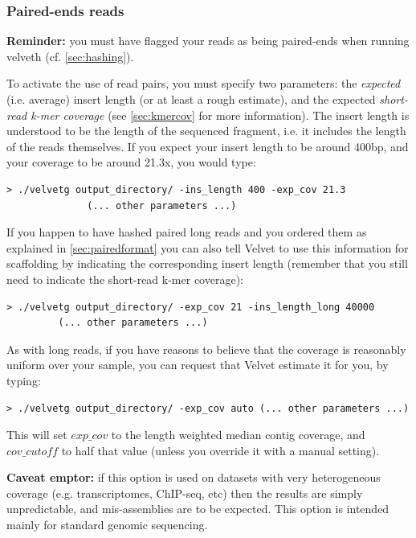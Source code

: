 \documentclass{article}
\begin{document}
	\subsubsection{Paired-ends reads}

\textbf{Reminder:} you must have flagged your reads as being paired-ends when running
velveth (cf. \ref{sec:hashing}).

To activate the use of read pairs, you must specify two parameters: the \emph{expected} (i.e. average) insert length (or at least a rough estimate), and the expected \emph{short-read k-mer coverage} (see \ref{sec:kmercov} for more information). The insert length is understood to be the length of the sequenced fragment, i.e. it includes the length of the reads themselves. If you expect your insert length to be around 400bp, and your coverage to be around 21.3x, you would type:

\begin{verbatim}
> ./velvetg output_directory/ -ins_length 400 -exp_cov 21.3 
	          (... other parameters ...)
\end{verbatim}

If you happen to have hashed paired long reads and you ordered them as explained in \ref{sec:pairedformat} you can also tell Velvet to use this information for scaffolding by indicating the corresponding insert length (remember that you still need to indicate the short-read k-mer coverage):

\begin{verbatim}
> ./velvetg output_directory/ -exp_cov 21 -ins_length_long 40000 
		 (... other parameters ...)
\end{verbatim}

As with long reads, if you have reasons to believe that the coverage is reasonably uniform over your sample, you can request that Velvet estimate it for you, by typing:

\begin{verbatim}
> ./velvetg output_directory/ -exp_cov auto (... other parameters ...)
\end{verbatim}

This will set $exp\_cov$ to the length weighted median contig coverage, and $cov\_cutoff$ to half that value (unless you override it with a manual setting).

\textbf{Caveat emptor:} if this option is used on datasets with very heterogeneous coverage (e.g. transcriptomes, ChIP-seq, etc) then the results are simply unpredictable, and mis-assemblies are to be expected. This option is intended mainly for standard genomic sequencing.
\end{document}
